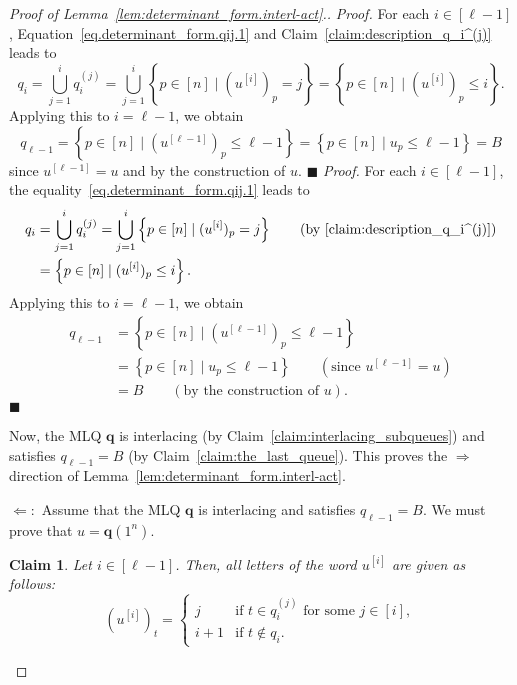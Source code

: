 \documentclass[reqno]{amsart}
\newcommand{\0}{\phantom{c}}
\newcommand{\qq}{\mathbf{q}}
\let\cupnonlimits\bigcup
\renewcommand{\bigcup}{\cupnonlimits\limits}
\newenvironment{subproof}{\textit{Proof.} }{\hfill$\blacksquare$ \medskip}
\newenvironment{verlong}{}{}
\newenvironment{vershort}{}{}
\newcommand{\set}[1]{\left\{ #1 \right\}}
\newcommand{\ive}[1]{\left[ #1 \right]}
\theoremstyle{plain}
\newtheorem{claim}[thm]{Claim}
\theoremstyle{definition}
\numberwithin{equation}{section}
\begin{document}
\begin{proof}[Proof of Lemma~\ref{lem:determinant_form.interl-act}.]
\begin{vershort}
\begin{subproof}
For each $i \in \ive{\ell-1}$, Equation~\eqref{eq.determinant_form.qij.1} and Claim~\ref{claim:description_q_i^(j)} leads to
\[
  q_i = \bigcup_{j=1}^i q_i^{(j)} = \bigcup_{j=1}^i \set{ p \in \ive{n} \mid ( u^{\left[  i\right] } )_p = j }
      = \set{ p \in \ive{n} \mid ( u^{\left[  i\right] } )_p \leq i } .
\]
Applying this to $i = \ell-1$, we obtain
\[
  q_{\ell-1}
  = \set{ p \in \ive{n} \mid ( u^{\left[\ell-1\right] } )_p \leq \ell-1 }
  = \set{ p \in \ive{n} \mid u_p \leq \ell-1 }
  = B
\]
since $u^{\left[  \ell-1\right]  } = u$ and by the construction of $u$.
\end{subproof}
\end{vershort}
\begin{verlong}
\begin{subproof}
For each $i \in \ive{\ell-1}$, the equality~\eqref{eq.determinant_form.qij.1} leads to
\begin{align*}
  q_i & = \bigcup_{j=1}^i q_i^{(j)} = \bigcup_{j=1}^i \set{ p \in \ive{n} \mid ( u^{\left[  i\right] } )_p = j }
            \qquad \left(\text{by \eqref{claim:description_q_i^(j)}}\right) \\
      &= \set{ p \in \ive{n} \mid ( u^{\left[  i\right] } )_p \leq i } .
\end{align*}
Applying this to $i = \ell-1$, we obtain
\begin{align*}
  q_{\ell-1}
  &= \set{ p \in \ive{n} \mid ( u^{\left[\ell-1\right] } )_p \leq \ell-1 } \\
  &= \set{ p \in \ive{n} \mid u_p \leq \ell-1 }
   \qquad \left(\text{since } u^{\left[  \ell-1\right]  } = u \right) \\
  &= B \qquad \left(\text{by the construction of } u \right) .
\end{align*}
\end{subproof}
\end{verlong}

Now, the MLQ $\qq$ is interlacing (by Claim~\ref{claim:interlacing_subqueues}) and satisfies $q_{\ell-1} = B$ (by Claim~\ref{claim:the_last_queue}).
This proves the $\Longrightarrow$ direction of Lemma~\ref{lem:determinant_form.interl-act}.

$\Longleftarrow:$
Assume that the MLQ $\qq$ is interlacing and satisfies $q_{\ell-1} = B$.
We must prove that $u = \qq(1^n)$.

\begin{claim}
\label{claim:describing_u^[i]}
Let $i \in \ive{\ell-1}$. Then, all letters of the
word $u^{\left[  i\right]}$ are given as follows:
\[
\left( u^{\left[  i\right]} \right)_t =
\begin{cases}
j & \text{if } t \in q_i^{(j)} \text{ for some } j \in\ive{i}\!, \\
i+1 & \text{if } t \notin q_i.
\end{cases}
\]
\end{claim}


\end{proof}
\end{document}
